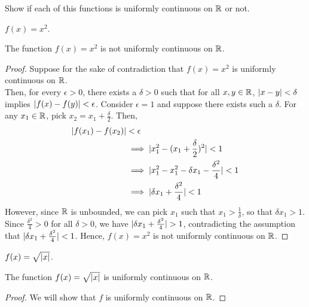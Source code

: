 \begin{problem}
  Show if each of this functions is uniformly continuous on $\mathbb{R}$ or not.
  \begin{enumroman}
    \item $f(x) = x^2$.
      \begin{answer}
        \begin{claim}
          The function $f(x) = x^2$ is not uniformly continuous on $\mathbb{R}$.
          \begin{proof}
            Suppose for the sake of contradiction that $f(x) = x^2$
            is uniformly continuous on $\mathbb{R}$. \\
            Then, for every $\epsilon > 0$, there exists a $\delta > 0$
            such that for all $x, y \in \mathbb{R}$, $\lvert x - y\rvert < \delta$ implies
            $\lvert f(x) - f(y)\rvert < \epsilon$.
            Consider $\epsilon = 1$ and suppose there exists such a $\delta$.
            For any $x_1 \in \mathbb{R}$, pick $x_2 = x_1 + \frac{\delta}{2}$.
            Then,
            \begin{align*}
              \lvert f(x_1) - f(x_2)\rvert &< \epsilon \\
                &\implies \lvert x_1^2 - (x_1 + \frac{\delta}{2})^2\rvert < 1 \\
                &\implies \lvert x_1^2 - x_1^2 - \delta x_1 - \frac{\delta^2}{4}\rvert < 1 \\
                &\implies \lvert\delta x_1 + \frac{\delta^2}{4}\rvert < 1 \\
            \end{align*}
            However, since $\mathbb{R}$ is unbounded, we can pick $x_1$ such that
            $x_1 > \frac{1}{\delta}$, so that $\delta x_1 > 1$.
            Since $\frac{\delta^2}{4} > 0$ for all $\delta > 0$,
            we have $\lvert\delta x_1 + \frac{\delta^2}{4}\rvert > 1$,
            contradicting the assumption that $\lvert\delta x_1 + \frac{\delta^2}{4}\rvert < 1$.
            Hence, $f(x) = x^2$ is not uniformly continuous on $\mathbb{R}$.
          \end{proof}
        \end{claim}
      \end{answer}
    \item $f(x) = \sqrt{\lvert x\rvert}$.
      \begin{answer}
        \begin{claim}
          The function $f(x) = \sqrt{\lvert x\rvert}$ is uniformly continuous on $\mathbb{R}$.
          \begin{proof}
            We will show that $f$ is uniformly continuous on $\mathbb{R}$.

\end{proof}
\end{claim}
\end{answer}
\end{enumroman}
\end{problem}
